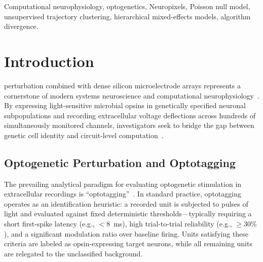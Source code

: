 \documentclass[10pt,journal,compsoc]{IEEEtran}
\begin{document}
{\begin{IEEEkeywords}
Computational neurophysiology, optogenetics, Neuropixels, Poisson null model, unsupervised trajectory clustering, hierarchical mixed-effects models, algorithm divergence.
\end{IEEEkeywords}}

\maketitle
\IEEEdisplaynontitleabstractindextext
\IEEEpeerreviewmaketitle

\section{Introduction}
 perturbation combined with dense silicon microelectrode arrays represents a cornerstone of modern systems neuroscience and computational neurophysiology~\cite{boyden2005millisecond,deisseroth2011optogenetics,jun2017fully}. By expressing light-sensitive microbial opsins in genetically specified neuronal subpopulations and recording extracellular voltage deflections across hundreds of simultaneously monitored channels, investigators seek to bridge the gap between genetic cell identity and circuit-level computation~\cite{lima2009labeled,kvitsiani2013distinct,siegle2021survey}.

\subsection{Optogenetic Perturbation and Optotagging}
The prevailing analytical paradigm for evaluating optogenetic stimulation in extracellular recordings is ``optotagging''~\cite{lima2009labeled}. In standard practice, optotagging operates as an identification heuristic: a recorded unit is subjected to pulses of light and evaluated against fixed deterministic thresholds—typically requiring a short first-spike latency (e.g., $<8$~ms), high trial-to-trial reliability (e.g., $\ge 30\%$), and a significant modulation ratio over baseline firing. Units satisfying these criteria are labeled as opsin-expressing target neurons, while all remaining units are relegated to the unclassified background.
\end{document}
